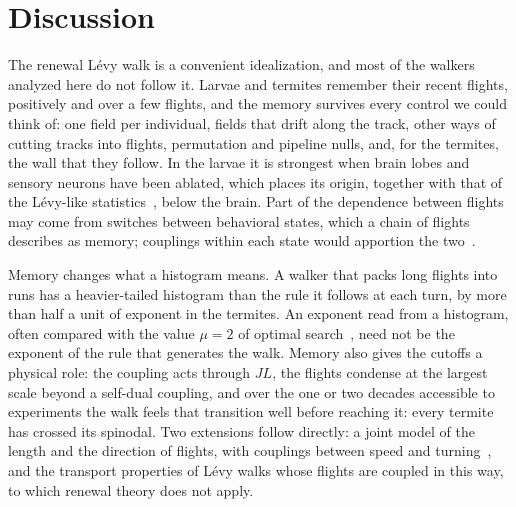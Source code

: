\section{Discussion}\label{sec:discussion}

The renewal L\'evy walk is a convenient idealization, and most of the walkers analyzed here do not follow it. Larvae and termites remember their recent flights, positively and over a few flights, and the memory survives every control we could think of: one field per individual, fields that drift along the track, other ways of cutting tracks into flights, permutation and pipeline nulls, and, for the termites, the wall that they follow. In the larvae it is strongest when brain lobes and sensory neurons have been ablated, which places its origin, together with that of the L\'evy-like statistics~\cite{Sims2019}, below the brain. Part of the dependence between flights may come from switches between behavioral states, which a chain of flights describes as memory; couplings within each state would apportion the two~\cite{Stoye2025}.

Memory changes what a histogram means. A walker that packs long flights into runs has a heavier-tailed histogram than the rule it follows at each turn, by more than half a unit of exponent in the termites. An exponent read from a histogram, often compared with the value $\mu=2$ of optimal search~\cite{Viswanathan1999}, need not be the exponent of the rule that generates the walk. Memory also gives the cutoffs a physical role: the coupling acts through $JL$, the flights condense at the largest scale beyond a self-dual coupling, and over the one or two decades accessible to experiments the walk feels that transition well before reaching it: every termite has crossed its spinodal. Two extensions follow directly: a joint model of the length and the direction of flights, with couplings between speed and turning~\cite{Jerison2020}, and the transport properties of L\'evy walks whose flights are coupled in this way, to which renewal theory does not apply.

